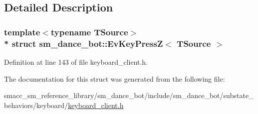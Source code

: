 \subsection{Detailed Description}
\subsubsection*{template$<$typename T\+Source$>$\\*
struct sm\+\_\+dance\+\_\+bot\+::\+Ev\+Key\+Press\+Z$<$ T\+Source $>$}



Definition at line 143 of file keyboard\+\_\+client.\+h.



The documentation for this struct was generated from the following file\+:\begin{DoxyCompactItemize}
\item 
smacc\+\_\+sm\+\_\+reference\+\_\+library/sm\+\_\+dance\+\_\+bot/include/sm\+\_\+dance\+\_\+bot/substate\+\_\+behaviors/keyboard/\hyperlink{keyboard__client_8h}{keyboard\+\_\+client.\+h}\end{DoxyCompactItemize}
